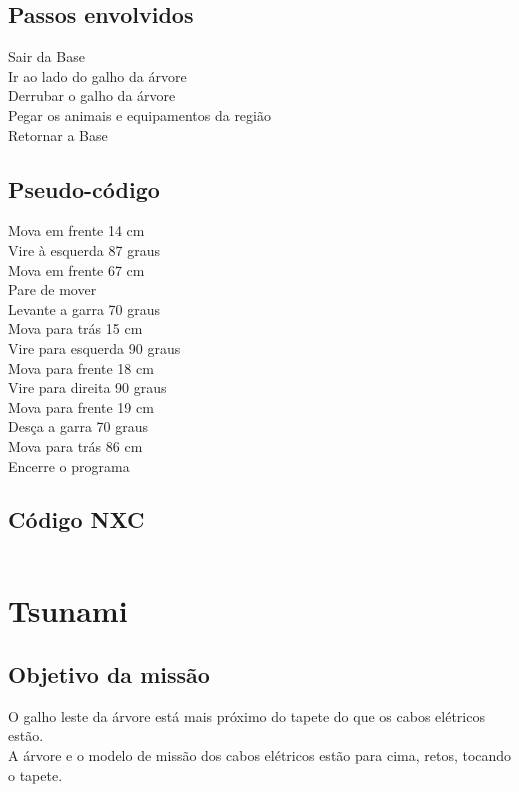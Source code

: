 \documentclass{article}
\begin{document}
	\subsection{Passos envolvidos}
		Sair da Base\\
    	Ir ao lado do galho da árvore\\
    	Derrubar o galho da árvore\\
    	Pegar os animais e equipamentos da região\\
   		Retornar a Base\\

   	\subsection{Pseudo-código}
   		Mova em frente 14 cm\\
	    Vire à esquerda 87 graus\\
	    Mova em frente 67 cm\\
	    Pare de mover\\
		Levante a garra 70 graus\\
	    Mova para trás 15 cm\\
	    Vire para esquerda 90 graus\\
	    Mova para frente 18 cm\\
	    Vire para direita 90 graus\\
	    Mova para frente 19 cm\\
	    Desça a garra 70 graus\\
	    Mova para trás 86 cm\\
	    Encerre o programa\\

	\subsection{Código NXC}
		\begin{tcolorbox}[]
			\inputminted{c}{codes/galho_da_arvore.nxc}
		\end{tcolorbox}

\newpage
\section{Tsunami}
	\subsection{Objetivo da missão}
		O galho leste da árvore está mais próximo do tapete do que os cabos elétricos estão.\\
		A árvore e o modelo de missão dos cabos elétricos estão para cima, retos, tocando o tapete.\\
\end{document}
